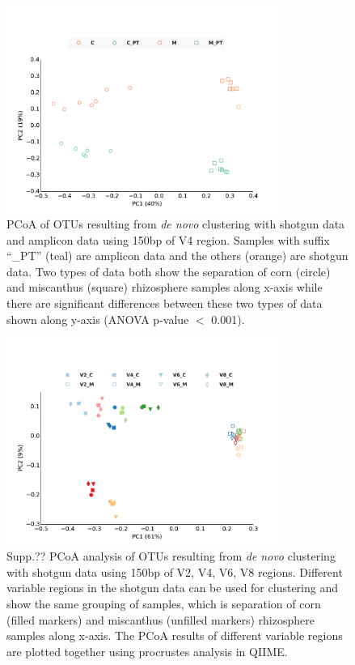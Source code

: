 \documentclass[12pt]{article}
\begin{document}
\begin{figure}[tbph!]
  \centering
  \includegraphics[width=0.8\textwidth]{figs/V4_SGvsPT_pcoa}
  \caption[PCoA of OTUs resulting from {\em de novo} clustering with shotgun data and amplicon data using 150bp of V4 region]{PCoA of OTUs resulting from {\em de novo} clustering with shotgun data and amplicon data using 150bp of V4 region. Samples with suffix ``\_PT'' (teal) are amplicon data and the others (orange) are shotgun data. Two types of data both show the separation of corn (circle) and miscanthus (square) rhizosphere samples along x-axis while there are significant differences between these two types of data shown along y-axis (ANOVA p-value $<$ 0.001).}
  \label{fig:V4_SGvsPT_pcoa}
\end{figure}

\begin{figure}[tbph!]
  \centering
  \includegraphics[width=0.8\textwidth]{figs/compare_vregion_color_1leg}
  \caption[PCoA analysis of OTUs resulting from {\em de novo} clustering with shotgun data using 150bp of V2, V4, V6, V8 regions]{Supp.?? PCoA analysis of OTUs resulting from {\em de novo} clustering with shotgun data using 150bp of V2, V4, V6, V8 regions. Different variable regions in the shotgun data can be used for clustering and show the same grouping of samples, which is separation of corn (filled markers) and miscanthus (unfilled markers) rhizosphere samples along x-axis. The PCoA results of different variable regions are plotted together using procrustes analysis in QIIME.}
  \label{fig:compare_vregion}
\end{figure}
\end{document}
